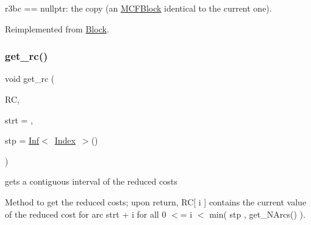 \begin{DoxyItemize}
\item r3bc == nullptr\+: the copy (an \mbox{\hyperlink{class_s_m_spp__di__unipi__it_1_1_m_c_f_block}{M\+C\+F\+Block}} identical to the current one). 
\end{DoxyItemize}

Reimplemented from \mbox{\hyperlink{class_s_m_spp__di__unipi__it_1_1_block_a2e682f5c0d4a74503c0cb5ab38fb6428}{Block}}.

\mbox{\label{class_s_m_spp__di__unipi__it_1_1_m_c_f_block_a0be3ac1934d307e08d84bcee5d9866d7}} 
\subsubsection{\texorpdfstring{get\+\_\+rc()}{get\_rc()}\hspace{0.1cm}{\footnotesize\ttfamily [1/2]}}
{\footnotesize\ttfamily void get\+\_\+rc (\begin{DoxyParamCaption}\item[{\mbox{\hyperlink{class_s_m_spp__di__unipi__it_1_1_m_c_f_block_a9a7c9495f1f1feab22f3c556b70f60f0}{Vec\+\_\+\+C\+Number}} \&}]{RC,  }\item[{\mbox{\hyperlink{class_s_m_spp__di__unipi__it_1_1_m_c_f_block_aee6156e2ce80720d57a082d80f39d8cc}{c\+\_\+\+Index}}}]{strt = {},  }\item[{\mbox{\hyperlink{class_s_m_spp__di__unipi__it_1_1_m_c_f_block_aee6156e2ce80720d57a082d80f39d8cc}{c\+\_\+\+Index}}}]{stp = {\ttfamily \mbox{\hyperlink{class_s_m_spp__di__unipi__it_1_1_inf}{Inf}}$<$~\mbox{\hyperlink{class_s_m_spp__di__unipi__it_1_1_m_c_f_block_ad53d6229d7ec28555a9c9c2fd9abf773}{Index}}~$>$()} }\end{DoxyParamCaption})}



gets a contiguous interval of the reduced costs 

Method to get the reduced costs; upon return, RC\mbox{[} i \mbox{]} contains the current value of the reduced cost for arc strt + i for all 0 $<$= i $<$ min( stp , get\+\_\+\+N\+Arcs() ). \mbox{\label{class_s_m_spp__di__unipi__it_1_1_m_c_f_block_ad965a7f55852d237761fc948b9e8095b}} 
